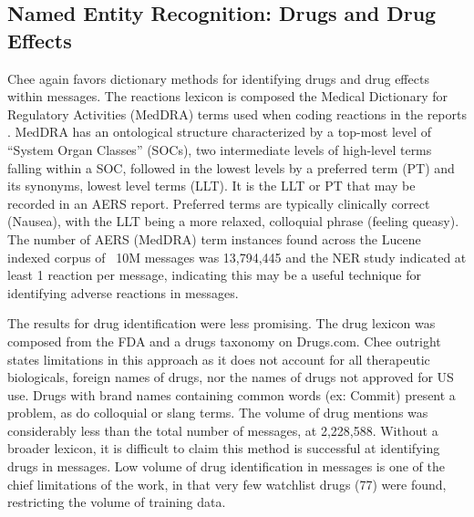 \documentclass[twoside,11pt]{article}
\begin{document}
\subsection{Named Entity Recognition: Drugs and Drug Effects}
Chee again favors dictionary methods for identifying drugs and drug effects within messages. The reactions lexicon is composed the Medical Dictionary for Regulatory Activities (MedDRA) terms used when coding reactions in the reports \citep{FAERS}. MedDRA has an ontological structure characterized by a top-most level of ``System Organ Classes'' (SOCs), two intermediate levels of high-level terms falling within a SOC, followed in the lowest levels by a preferred term (PT) and its synonyms, lowest level terms (LLT). It is the LLT or PT that may be recorded in an AERS report. Preferred terms are typically clinically correct (Nausea), with the LLT being a more relaxed, colloquial phrase (feeling queasy). The number of AERS (MedDRA) term instances found across the Lucene indexed corpus of ~10M messages was 13,794,445 and the NER study indicated at least 1 reaction per message, indicating this may be a useful technique for identifying adverse reactions in messages.
\par The results for drug identification were less promising.  The drug lexicon was composed from the FDA and a drugs taxonomy on Drugs.com. Chee outright states limitations in this approach as it does not account for all therapeutic biologicals, foreign names of drugs, nor the names of drugs not approved for US use. Drugs with brand names containing common words (ex: Commit) present a problem, as do colloquial or slang terms. The volume of drug mentions was considerably less than the total number of messages, at 2,228,588. Without a broader lexicon, it is difficult to claim this method is successful at identifying drugs in messages. Low volume of drug identification in messages is one of the chief limitations of the work, in that very few watchlist drugs (77) were found, restricting the volume of training data.
\end{document}
